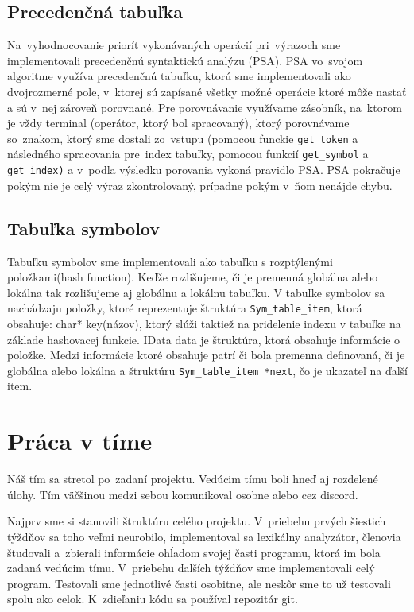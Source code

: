 \documentclass[a4paper, 11pt]{article}
\begin{document}
    \subsection{Precedenčná tabuľka}
    
    Na~vyhodnocovanie priorít vykonávaných operácií pri~výrazoch sme implementovali precedenčnú syntaktickú analýzu (PSA). PSA vo~svojom algoritme využíva precedenčnú tabuľku, ktorú sme implementovali ako dvojrozmerné pole, v~ktorej sú zapísané všetky možné operácie ktoré môže nastať a sú v~nej zároveň porovnané. Pre porovnávanie využívame zásobník, na~ktorom je vždy terminal (operátor, ktorý bol spracovaný), ktorý porovnávame so~znakom, ktorý sme dostali zo~vstupu (pomocou funckie \texttt{get\_token} a následného spracovania pre~index tabuľky, pomocou funkcií \texttt{get\_symbol} a \texttt{get\_index)} a v~podľa výsledku porovania vykoná pravidlo PSA. PSA pokračuje pokým nie je celý výraz zkontrolovaný, prípadne pokým v~ňom nenájde chybu.
    
    
    
    \subsection{Tabuľka symbolov}
    
    Tabuľku symbolov sme implementovali ako tabuľku s rozptýlenými položkami(hash function). Keďže rozlišujeme, či je premenná globálna alebo lokálna tak rozlišujeme aj globálnu a lokálnu tabuľku. V tabuľke symbolov sa nachádzaju položky, ktoré reprezentuje štruktúra
    \texttt{Sym\_table\_item}, ktorá obsahuje: char* key(názov), ktorý slúži taktiež na pridelenie indexu v tabuľke na základe hashovacej funkcie. IData data je štruktúra, ktorá obsahuje informácie o položke. Medzi informácie ktoré obsahuje patrí či bola premenna definovaná, či je globálna alebo lokálna a štruktúru \texttt{Sym\_table\_item *next}, čo je ukazateľ na ďalší item.
    
    \section{Práca v tíme}
    
    Náš tím sa stretol po~zadaní projektu. Vedúcim tímu boli hneď aj rozdelené úlohy. Tím väčšinou medzi sebou komunikoval osobne alebo cez discord. 
    
    Najprv sme si stanovili štruktúru celého projektu. V~priebehu prvých šiestich týždňov sa toho veľmi neurobilo, implementoval sa lexikálny analyzátor, členovia študovali a~zbierali informácie ohĺadom svojej časti programu, ktorá im bola zadaná vedúcim tímu. V~priebehu ďalších týždňov sme implementovali celý program. Testovali sme jednotlivé časti osobitne, ale neskôr sme to už testovali spolu ako celok. K~zdieľaniu kódu sa používal repozitár git.
    
\end{document}
